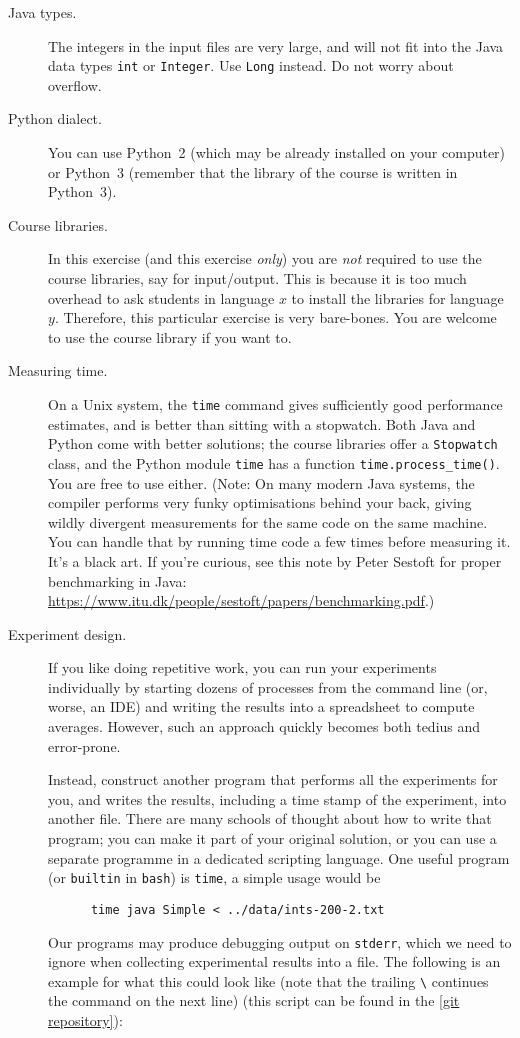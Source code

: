 \documentclass{tufte-handout}
\begin{document}
\begin{description}
  \item[Java types.] The integers in the input files are very large, and will not fit into the Java data types \texttt{int} or \texttt{Integer}.
    Use \texttt{Long} instead.
    Do not worry about overflow.
  \item[Python dialect.] You can use Python~2 (which may be already installed on your computer) or Python~3 (remember that the library of the course is written in Python~3).
  \item[Course libraries.]
    In this exercise (and this exercise \emph{only}) you are \emph{not} required to use the course libraries, say for input/output.
    This is because it is too much overhead to ask students in language $x$ to install the libraries for language $y$.
    Therefore, this particular exercise is very bare-bones.
    You are welcome to use the course library if you want to.
  \item[Measuring time.]
    On a Unix system, the \texttt{time} command gives sufficiently good performance estimates, and is better than sitting with a stopwatch.
    Both Java and Python come with better solutions; the course libraries offer a \texttt{Stopwatch} class, and the Python module \texttt{time} has a function \texttt{time.process\_time()}. You are free to use either. 
    (Note: On many modern Java systems, the compiler performs very funky
    optimisations behind your back, giving wildly divergent measurements for
    the same code on the same machine.  You can handle that by running time
    code a few times before measuring it.  It's a black art.  If you're
    curious, see this note by Peter Sestoft for proper benchmarking in Java:
    \url{https://www.itu.dk/people/sestoft/papers/benchmarking.pdf}.)
  \item[Experiment design.]
    If you like doing repetitive work, you  can run your experiments individually by starting dozens of processes from the command line (or, worse, an IDE) and writing the results into a spreadsheet to compute averages.
    However, such an approach quickly becomes both tedius and error-prone.

    Instead, construct another program that performs all the experiments for you, and writes the results, including a time stamp of the experiment, into another file.
    There are many schools of thought about how to write that program; you can make it part of your original solution, or you can use a separate programme in a dedicated scripting language.
    One useful program (or \texttt{builtin} in \texttt{bash}) is \texttt{time}, a simple usage would be 
    \begin{lstlisting}
      time java Simple < ../data/ints-200-2.txt
    \end{lstlisting}
    Our programs may produce debugging output on \texttt{stderr}, which we need to ignore when collecting experimental results into a file. 
    The following is an example for what this could look like (note that the trailing \verb+\+ continues the command on the next line) (this script can be found in the \href{https://bitbucket.org/rikj/bads-labs/src/master/foursum/src/simpleExp.sh}{[git repository]}):
    


\end{description}
\end{document}

